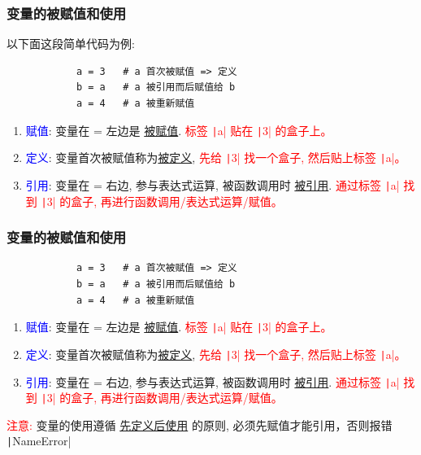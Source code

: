 \documentclass[handout]{ctexbeamer}
\begin{document}
    \begin{frame}[fragile]
        \frametitle{变量的被赋值和使用}
        以下面这段简单代码为例:
        \begin{verbatim}
            a = 3   # a 首次被赋值 => 定义
            b = a   # a 被引用而后赋值给 b
            a = 4   # a 被重新赋值
        \end{verbatim}

        \begin{enumerate}
            \item \textcolor{blue}{赋值}: 变量在 = 左边是 \underline{被赋值}.  \textcolor{red}{标签 \texttt|a| 贴在 \texttt|3| 的盒子上。} 
            \item \textcolor{blue}{定义}: 变量首次被赋值称为\underline{被定义}, \textcolor{red}{先给 \texttt|3| 找一个盒子, 然后贴上标签 \texttt|a|。} 
            \item \textcolor{blue}{引用}: 变量在 = 右边, 参与表达式运算, 被函数调用时 \underline{被引用}. \textcolor{red}{通过标签 \texttt|a| 找到 \texttt|3| 的盒子, 再进行函数调用/表达式运算/赋值。} 
        \end{enumerate}
    \end{frame}
    \begin{frame}[fragile]
        \frametitle{变量的被赋值和使用}
        \begin{verbatim}
            a = 3   # a 首次被赋值 => 定义
            b = a   # a 被引用而后赋值给 b
            a = 4   # a 被重新赋值
        \end{verbatim}

        \begin{enumerate}
            \item \textcolor{blue}{赋值}: 变量在 = 左边是 \underline{被赋值}.  \textcolor{red}{标签 \texttt|a| 贴在 \texttt|3| 的盒子上。} \pause
            \item \textcolor{blue}{定义}: 变量首次被赋值称为\underline{被定义}, \textcolor{red}{先给 \texttt|3| 找一个盒子, 然后贴上标签 \texttt|a|。}  \pause
            \item \textcolor{blue}{引用}: 变量在 = 右边, 参与表达式运算, 被函数调用时 \underline{被引用}. \textcolor{red}{通过标签 \texttt|a| 找到 \texttt|3| 的盒子, 再进行函数调用/表达式运算/赋值。} 
        \end{enumerate}
        \begin{notice}
            \textcolor{red}{注意:} 变量的使用遵循 \underline{先定义后使用} 的原则, 必须先赋值才能引用，否则报错 \texttt|NameError|
        \end{notice}
    \end{frame}
\end{document}

